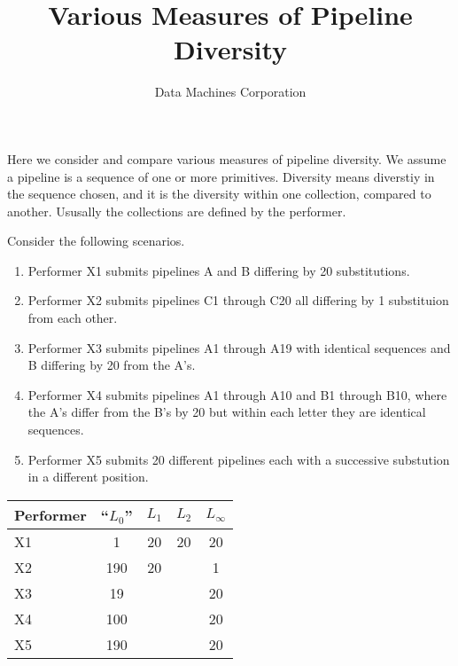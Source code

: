 \documentclass{article}
\title{Various Measures of Pipeline Diversity}
\author{Data Machines Corporation}
\begin{document}
\maketitle

Here we consider and compare various measures of pipeline diversity.
We assume a pipeline is a sequence of one or more primitives.
Diversity means diverstiy in the sequence chosen, and it is the
diversity within one collection, compared to another.  Ususally the
collections are defined by the performer.

Consider the following scenarios.

\begin{enumerate}
\item 
  Performer X1 submits pipelines A and B differing by 20 substitutions.
\item
  Performer X2 submits pipelines C1 through C20 all differing by 1
  substituion from each other.
\item
  Performer X3 submits pipelines A1 through A19 with identical
  sequences and B differing by 20 from the A's.
\item
  Performer X4 submits pipelines A1 through A10 and B1 through B10,
  where the A's differ from the B's by 20 but within each letter they
  are identical sequences.
\item
  Performer X5 submits 20 different pipelines each with a successive
  substution in a different position.
\end{enumerate}

\begin{tabular}{lcccc}
  Performer & ``$L_0$'' & $L_1$ & $L_2$ & $L_\infty$ \\
  \hline
  X1 & 1 & 20 & 20 & 20 \\
  X2 & 190 & 20 & & 1 \\
  X3 & 19 & & & 20 \\
  X4 & 100 & & & 20 \\
  X5 & 190 & & & 20
\end{tabular}
\end{document}
